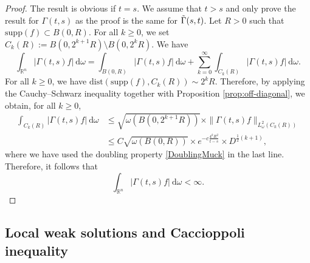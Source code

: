 \documentclass[12pt, letterpaper]{amsart}
\theoremstyle{definition}
\theoremstyle{remark}
\numberwithin{equation}{section}
\begin{document}
\begin{proof}
The result is obvious if $t=s$. We assume that $t>s$ and only prove the result for $\Gamma(t,s)$ as the proof is the same for $\Tilde{\Gamma}(s,t)$. Let $R>0$ such that $\mathrm{supp}(f)\subset B(0,R)$. For all $k\ge 0$, we set $C_k(R):=B(0,2^{k+1}R)\setminus B(0,2^{k}R)$. We have 
$$\int_{\mathbb{R}^n}  | \Gamma(t,s)f | \ \mathrm d \omega = \int_{B(0,R)}  | \Gamma(t,s)f | \ \mathrm d \omega + \sum_{k=0}^{\infty} \int_{C_k(R)}  | \Gamma(t,s)f | \ \mathrm d \omega.$$
For all $k \ge 0$, we have $\mathrm{dist}(\mathrm{supp}(f),C_k(R)) \sim 2^k R$. Therefore, by applying the Cauchy–Schwarz inequality together with Proposition \ref{prop:off-diagonal}, we obtain, for all $k\ge0$,
\begin{align*}
    \int_{C_k(R)}  | \Gamma(t,s)f | \ \mathrm d \omega &\le \sqrt{\omega(B(0,2^{k+1}R))} \times \|\Gamma(t,s)f \|_{L^2_\omega(C_k(R))}
    \\& \le C \sqrt{\omega(B(0,R))} \times  e^{-c \frac{4^k R^2}{t-s}} \times D^{\frac{1}{2}(k+1)},
\end{align*}
where we have used the doubling property \eqref{DoublingMuck} in the last line. Therefore, it follows that
\begin{equation*}
    \int_{\mathbb{R}^n}  | \Gamma(t,s)f | \ \mathrm d \omega < \infty.
\end{equation*}
\end{proof}
\subsection{Local weak solutions and Caccioppoli inequality} 
\end{document}
